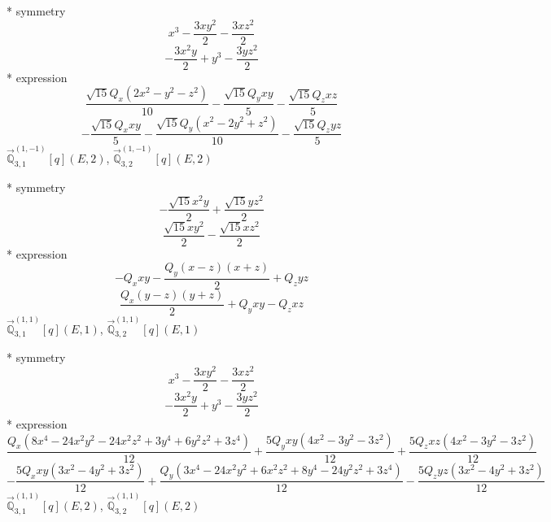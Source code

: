 \documentclass[fleqn,8pt]{jsarticle}
\begin{document}
\noindent\quad ** symmetry
\begin{dmath*}
x^{3} - \frac{3 x y^{2}}{2} - \frac{3 x z^{2}}{2}
\end{dmath*}
\begin{dmath*}
- \frac{3 x^{2} y}{2} + y^{3} - \frac{3 y z^{2}}{2}
\end{dmath*}
\noindent\quad ** expression
\begin{dmath*}
\frac{\sqrt{15} Q_{x} \left(2 x^{2} - y^{2} - z^{2}\right)}{10} - \frac{\sqrt{15} Q_{y} x y}{5} - \frac{\sqrt{15} Q_{z} x z}{5}
\end{dmath*}
\begin{dmath*}
- \frac{\sqrt{15} Q_{x} x y}{5} - \frac{\sqrt{15} Q_{y} \left(x^{2} - 2 y^{2} + z^{2}\right)}{10} - \frac{\sqrt{15} Q_{z} y z}{5}
\end{dmath*}
\noindent\quad $\vec{\mathbb{Q}}_{3,1}^{(1,-1)}[q](E,2)$, $\vec{\mathbb{Q}}_{3,2}^{(1,-1)}[q](E,2)$

\noindent\quad ** symmetry
\begin{dmath*}
- \frac{\sqrt{15} x^{2} y}{2} + \frac{\sqrt{15} y z^{2}}{2}
\end{dmath*}
\begin{dmath*}
\frac{\sqrt{15} x y^{2}}{2} - \frac{\sqrt{15} x z^{2}}{2}
\end{dmath*}
\noindent\quad ** expression
\begin{dmath*}
- Q_{x} x y - \frac{Q_{y} \left(x - z\right) \left(x + z\right)}{2} + Q_{z} y z
\end{dmath*}
\begin{dmath*}
\frac{Q_{x} \left(y - z\right) \left(y + z\right)}{2} + Q_{y} x y - Q_{z} x z
\end{dmath*}
\noindent\quad $\vec{\mathbb{Q}}_{3,1}^{(1,1)}[q](E,1)$, $\vec{\mathbb{Q}}_{3,2}^{(1,1)}[q](E,1)$

\noindent\quad ** symmetry
\begin{dmath*}
x^{3} - \frac{3 x y^{2}}{2} - \frac{3 x z^{2}}{2}
\end{dmath*}
\begin{dmath*}
- \frac{3 x^{2} y}{2} + y^{3} - \frac{3 y z^{2}}{2}
\end{dmath*}
\noindent\quad ** expression
\begin{dmath*}
\frac{Q_{x} \left(8 x^{4} - 24 x^{2} y^{2} - 24 x^{2} z^{2} + 3 y^{4} + 6 y^{2} z^{2} + 3 z^{4}\right)}{12} + \frac{5 Q_{y} x y \left(4 x^{2} - 3 y^{2} - 3 z^{2}\right)}{12} + \frac{5 Q_{z} x z \left(4 x^{2} - 3 y^{2} - 3 z^{2}\right)}{12}
\end{dmath*}
\begin{dmath*}
- \frac{5 Q_{x} x y \left(3 x^{2} - 4 y^{2} + 3 z^{2}\right)}{12} + \frac{Q_{y} \left(3 x^{4} - 24 x^{2} y^{2} + 6 x^{2} z^{2} + 8 y^{4} - 24 y^{2} z^{2} + 3 z^{4}\right)}{12} - \frac{5 Q_{z} y z \left(3 x^{2} - 4 y^{2} + 3 z^{2}\right)}{12}
\end{dmath*}
\noindent\quad $\vec{\mathbb{Q}}_{3,1}^{(1,1)}[q](E,2)$, $\vec{\mathbb{Q}}_{3,2}^{(1,1)}[q](E,2)$
\end{document}
